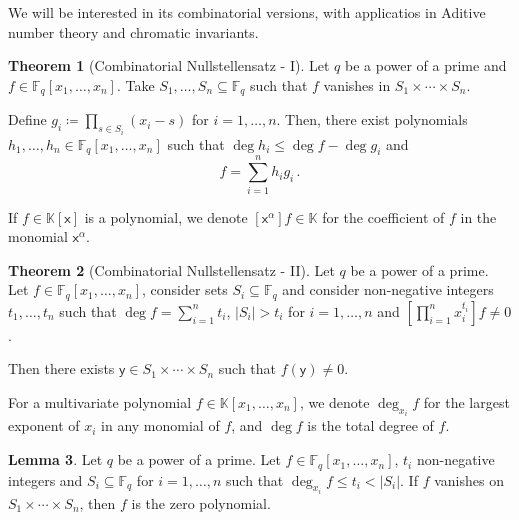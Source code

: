 \documentclass[12pt]{amsart}
\theoremstyle{definition}
\newtheorem{thm}{Theorem}[section]
\newtheorem{lm}[thm]{Lemma}
\newcommand{\F}{\mathbb{F}}
\newcommand{\K}{\mathbb{K}}
\newcommand{\vx}{\mathsf{x}}
\newcommand{\vy}{\mathsf{y}}
\begin{document}
We will be interested in its combinatorial versions, with applicatios in Aditive number theory and chromatic invariants.

\begin{thm}[Combinatorial Nullstellensatz - I]\label{thm:NSS-1}
Let $q$ be a power of a prime and $f\in \F_q[x_1, \ldots, x_n]$.
Take $S_1, \ldots, S_n \subseteq \F_q$ such that $f$ vanishes in $S_1\times \cdots \times S_n$.

Define $g_i\coloneqq \prod_{s \in S_i} (x_i - s)$ for $i=1, \ldots, n$.
Then, there exist polynomials $h_1, \ldots, h_n \in \F_q[x_1, \ldots, x_n]$ such that $\deg h_i \leq \deg f - \deg g_i$ and 
$$f = \sum_{i=1}^n h_i g_i \, .$$
\end{thm}

If $f\in \K[\vx]$ is a polynomial, we denote $[\vx^\alpha] f\in \K$ for the coefficient of $f$ in the monomial $\vx^{\alpha}$.

\begin{thm}[Combinatorial Nullstellensatz - II]\label{thm:NSS-2}
Let $q$ be a power of a prime.
Let $f \in \F_q[x_1, \ldots, x_n]$, consider sets $S_i \subseteq \F_q$ and consider non-negative integers $t_1, \ldots, t_n$ such that $\deg f = \sum_{i=1}^n t_i$, $|S_i| > t_i$ for $i=1, \ldots, n$ and $\left[ \prod_{i=1}^n x_i^{t_i} \right] f \neq 0$.

Then there exists $\vy \in S_1\times \cdots \times S_n$ such that $f(\vy) \neq 0$.
\end{thm}

For a multivariate polynomial $f \in \K[x_1, \ldots, x_n]$, we denote $\deg_{x_i} f $ for the largest exponent of $x_i$ in any monomial of $f$, and $\deg f$ is the total degree of $f$.

\begin{lm}\label{lm:large_vanishing_poly}
Let $q$ be a power of a prime.
Let $f\in \F_q[x_1, \ldots, x_n]$, $t_i$ non-negative integers and $S_i \subseteq \F_q$ for $i=1, \ldots, n$ such that $\deg_{x_i} f \leq t_i < |S_i|$.
If $f$ vanishes on $S_1\times \cdots \times S_n$, then $f$ is the zero polynomial.
\end{lm}
\end{document}
